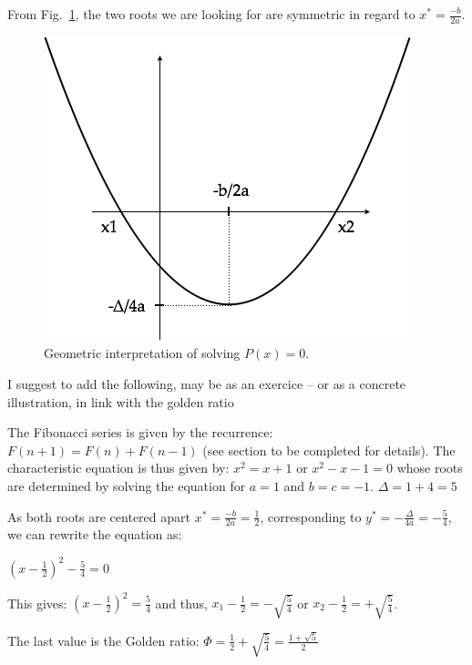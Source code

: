 From Fig.~\ref{fig:SecondDegree}, the two roots we are looking for are symmetric in regard to $x^*=\frac{-b}{2a}$.
\begin{figure}[htb]
\begin{center}
       \includegraphics[scale=0.4]{FiguresArithmetic/SecondDegree}
\caption{Geometric interpretation of solving $P(x)=0$.}
\label{fig:SecondDegree}
\end{center}
\end{figure}

{\Denis I suggest to add the following, may be as an exercice -- or as a concrete illustration, in link with the golden ratio}

The Fibonacci series is given by the recurrence:
$F(n+1) = F(n) + F(n-1)$ (see section {\Denis to be completed} for details).
The characteristic equation is thus given by:
$x^2 = x + 1$ or $x^2 - x - 1 = 0$ whose roots are determined by solving the equation for $a=1$ and $b=c=-1$.
$\Delta = 1+4 = 5$

As both roots are centered apart $x^*=\frac{-b}{2a}= \frac{1}{2}$, corresponding to $y^*= -\frac{\Delta}{4a} = -\frac{5}{4}$, we can rewrite the equation as:

$(x-\frac{1}{2})^2 - \frac{5}{4} = 0$

This gives: $(x-\frac{1}{2})^2 = \frac{5}{4}$ and thus, $x_1-\frac{1}{2} = - \sqrt{\frac{5}{4}}$ or $x_2-\frac{1}{2} = + \sqrt{\frac{5}{4}}$.

The last value is the Golden ratio: $\Phi = \frac{1}{2} + \sqrt{\frac{5}{4}} = \frac{1+\sqrt{5}}{2}$

